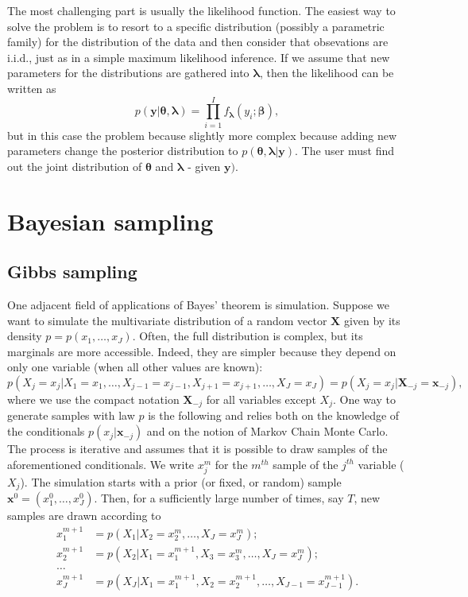 \documentclass[]{krantz}
\theoremstyle{definition}
\theoremstyle{definition}
\theoremstyle{definition}
\theoremstyle{remark}
\begin{document}
The most challenging part is usually the likelihood function. The
easiest way to solve the problem is to resort to a specific distribution
(possibly a parametric family) for the distribution of the data and then
consider that obsevations are i.i.d., just as in a simple maximum
likelihood inference. If we assume that new parameters for the
distributions are gathered into \(\boldsymbol{\lambda}\), then the
likelihood can be written as \begin{equation}
\label{eq:likelihood}
p(\textbf{y} |\boldsymbol{\theta}, \boldsymbol{\lambda})=\prod_{i=1}^I f_{\boldsymbol{\lambda}}(y_i; \boldsymbol{\beta}), 
\end{equation} but in this case the problem because slightly more
complex because adding new parameters change the posterior distribution
to \(p(\boldsymbol{\theta}, \boldsymbol{\lambda}|\textbf{y})\). The user
must find out the joint distribution of \(\boldsymbol{\theta}\) and
\(\boldsymbol{\lambda}\) - given \(\textbf{y})\).

\hypertarget{bayesian-sampling}{%
\section{Bayesian sampling}\label{bayesian-sampling}}

\hypertarget{gibbs-sampling}{%
\subsection{Gibbs sampling}\label{gibbs-sampling}}

One adjacent field of applications of Bayes' theorem is simulation.
Suppose we want to simulate the multivariate distribution of a random
vector \(\textbf{X}\) given by its density \(p=p(x_1,\dots,x_J)\).
Often, the full distribution is complex, but its marginals are more
accessible. Indeed, they are simpler because they depend on only one
variable (when all other values are known):
\[p(X_j=x_j|X_1= x_1,\dots,X_{j-1}=x_{j-1},X_{j+1}=x_{j+1},\dots,X_J=x_J)=p(X_j=x_j|\textbf{X}_{-j}=\textbf{x}_{-j}),\]
where we use the compact notation \(\textbf{X}_{-j}\) for all variables
except \(X_j\). One way to generate samples with law \(p\) is the
following and relies both on the knowledge of the conditionals
\(p(x_j|\textbf{x}_{-j})\) and on the notion of Markov Chain Monte
Carlo. The process is iterative and assumes that it is possible to draw
samples of the aforementioned conditionals. We write \(x_j^{m}\) for the
\(m^{th}\) sample of the \(j^{th}\) variable (\(X_j\)). The simulation
starts with a prior (or fixed, or random) sample
\(\textbf{x}^0=(x^0_1,\dots,x^0_J)\). Then, for a sufficiently large
number of times, say \(T\), new samples are drawn according to
\begin{align*}
x_1^{m+1} &= p(X_1|X_2=x_2^{m}, \dots ,X_J=x_J^m) ;\\
x_2^{m+1} &=p(X_2|X_1=x_1^{m+1}, X_3=x^{m}_3, \dots, X_J=x_J^m); \\
\dots& \\
x_J^{m+1}&= p(X_J|X_1=x_1^{m+1}, X_2=x_2^{m+1}, \dots, X_{J-1}=x_{J-1}^{m+1}).
\end{align*}
\end{document}
